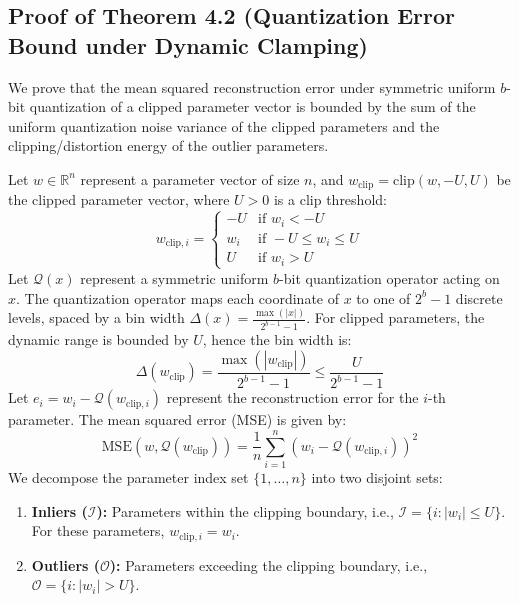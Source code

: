 \documentclass{article}
\theoremstyle{plain}
\theoremstyle{definition}
\theoremstyle{remark}
\begin{document}
\subsection{Proof of Theorem 4.2 (Quantization Error Bound under Dynamic Clamping)}
\label{app:quantization_proof}
We prove that the mean squared reconstruction error under symmetric uniform $b$-bit quantization of a clipped parameter vector is bounded by the sum of the uniform quantization noise variance of the clipped parameters and the clipping/distortion energy of the outlier parameters.

Let $w \in \mathbb{R}^n$ represent a parameter vector of size $n$, and $w_{\text{clip}} = \text{clip}(w, -U, U)$ be the clipped parameter vector, where $U > 0$ is a clip threshold:
\begin{equation}
    w_{\text{clip}, i} = \begin{cases}
        -U & \text{if } w_i < -U \\
        w_i & \text{if } -U \leq w_i \leq U \\
        U & \text{if } w_i > U
    \end{cases}
\end{equation}
Let $\mathcal{Q}(x)$ represent a symmetric uniform $b$-bit quantization operator acting on $x$. The quantization operator maps each coordinate of $x$ to one of $2^b - 1$ discrete levels, spaced by a bin width $\Delta(x) = \frac{\max(|x|)}{2^{b-1}-1}$.
For clipped parameters, the dynamic range is bounded by $U$, hence the bin width is:
\begin{equation}
    \Delta(w_{\text{clip}}) = \frac{\max(|w_{\text{clip}}|)}{2^{b-1}-1} \leq \frac{U}{2^{b-1}-1}
\end{equation}
Let $e_i = w_i - \mathcal{Q}(w_{\text{clip}, i})$ represent the reconstruction error for the $i$-th parameter. The mean squared error (MSE) is given by:
\begin{equation}
    \text{MSE}(w, \mathcal{Q}(w_{\text{clip}})) = \frac{1}{n} \sum_{i=1}^n (w_i - \mathcal{Q}(w_{\text{clip}, i}))^2
\end{equation}
We decompose the parameter index set $\{1, \dots, n\}$ into two disjoint sets:
\begin{enumerate}
    \item \textbf{Inliers ($\mathcal{I}$):} Parameters within the clipping boundary, i.e., $\mathcal{I} = \{i : |w_i| \leq U\}$. For these parameters, $w_{\text{clip}, i} = w_i$.
    \item \textbf{Outliers ($\mathcal{O}$):} Parameters exceeding the clipping boundary, i.e., $\mathcal{O} = \{i : |w_i| > U\}$.
\end{enumerate}
\end{document}
